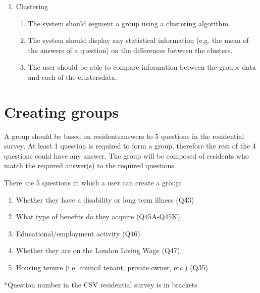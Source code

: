 \begin{enumerate}
\begin{enumerate}
		\item 1.	The main data used in the visualizations should be the CSV of Lambeth\textquotesingle s Residential Survey and its Code Translation.
	\end{enumerate}
	\item Clustering
	\begin{enumerate}
		\item The system should segment a group using a clustering algorithm.
		\item The system should display any statistical information (e.g. the mean of the answers of a question) on the differences between the clusters.
		\item The user should be able to compare information between the group\textquotesingle s data and each of the clusters\textquotesingle  data.
	\end{enumerate}
\end{enumerate}


\section{Creating groups} \label{creating_groups}
A group should be based on residents\textquotesingle  answers to 5 questions in the residential survey. At least 1 question is required to form a group, therefore the rest of the 4 questions could have any answer. The group will be composed of residents who match the required answer(s) to the required questions.\par

There are 5 questions in which a user can create a group:

\begin{enumerate}
	\item Whether they have a disability or long term illness (Q43)

	\item What type of benefits do they acquire (Q45A-Q45K)
	\item Educational/employment activity (Q46)
	\item Whether they are on the London Living Wage (Q47)
	\item Housing tenure (i.e. council tenant, private owner, etc.) (Q35)
\end{enumerate}

*Question number in the CSV residential survey is in brackets.


